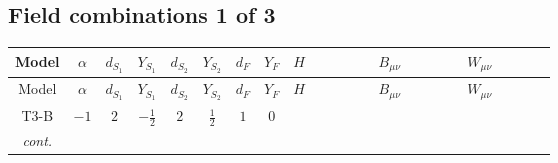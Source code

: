 \documentclass[8pt]{article}
\begin{document}
\begin{landscape}
\subsection*{Field combinations 1 of 3}
\begin{longtable}{@{}cccccccc >{\raggedright\arraybackslash}p{0.21\linewidth} >{\raggedright\arraybackslash}p{0.21\linewidth} >{\raggedright\arraybackslash}p{0.21\linewidth}@{}}
\toprule
Model & $\alpha$ & $d_{S_1}$ & $Y_{S_1}$ & $d_{S_2}$ & $Y_{S_2}$ & $d_F$ & $Y_F$ & $H$ & $B_{\mu\nu}$ & $W_{\mu\nu}$ \\
\midrule
\endfirsthead
\toprule
Model & $\alpha$ & $d_{S_1}$ & $Y_{S_1}$ & $d_{S_2}$ & $Y_{S_2}$ & $d_F$ & $Y_F$ & $H$ & $B_{\mu\nu}$ & $W_{\mu\nu}$ \\
\midrule
\endhead
T3-B & $-1$ & $2$ & $-\frac{1}{2}$ & $2$ & $\frac{1}{2}$ & $1$ & $0$ & \scriptsize\adjustbox{max width=\linewidth}{$\begin{gathered} +C_{\text{H2}} H_{a_1} H_{a_1}{}^{\dagger } \\ -H_{a_1} \mu ^2 H_{a_1}{}^{\dagger } \\ +\frac{4 \hbar  \overline{\lambda_5} H_{a_1} H_{a_2} \lambda_5 H_{a_1}{}^{\dagger } H_{a_2}{}^{\dagger }}{3 \epsilon }\end{gathered}$} & \scriptsize\adjustbox{max width=\linewidth}{$\begin{gathered} -\frac{\hbar  B_{\mu _1\mu _2}^2}{12 \epsilon } \\ -\frac{1}{24} \hbar  \log \left(\frac{\bar{\mu}^{2}}{m_1^2}\right) B_{\mu _1\mu _2}^2 \\ -\frac{1}{24} \hbar  \log \left(\frac{\bar{\mu}^{2}}{m_2^2}\right) B_{\mu _1\mu _2}^2\end{gathered}$} & \scriptsize\adjustbox{max width=\linewidth}{$\begin{gathered} -\frac{\hbar  \left(W_{\mu _1\mu _2}^{A_1}\right){}^2}{12 \epsilon } \\ -\frac{1}{24} \hbar  \log \left(\frac{\bar{\mu}^{2}}{m_1^2}\right) \left(W_{\mu _1\mu _2}^{A_1}\right){}^2 \\ -\frac{1}{24} \hbar  \log \left(\frac{\bar{\mu}^{2}}{m_2^2}\right) \left(W_{\mu _1\mu _2}^{A_1}\right){}^2\end{gathered}$} \\
\textit{cont.} &  &  &  &  &  &  &  & \scriptsize\adjustbox{max width=\linewidth}{$\begin{gathered} +\frac{4 \hbar  \overline{\lambda_5} H_{a_1} H_{a_2} m_1^2 \lambda_5 H_{a_1}{}^{\dagger } H_{a_2}{}^{\dagger }}{3 \left(m_1^2-m_2^2\right)} \\ +\frac{4 \hbar  \log \left(\frac{\bar{\mu}^{2}}{m_1^2}\right) \overline{\lambda_5} H_{a_1} H_{a_2} m_1^2 \lambda_5 H_{a_1}{}^{\dagger } H_{a_2}{}^{\dagger }}{3 \left(m_1^2-m_2^2\right)} \\ -\frac{4 \hbar  \overline{\lambda_5} H_{a_1} H_{a_2} m_2^2 \lambda_5 H_{a_1}{}^{\dagger } H_{a_2}{}^{\dagger }}{3 \left(m_1^2-m_2^2\right)}\end{gathered}$} &  &  \\

\end{longtable}
\end{landscape}
\end{document}
